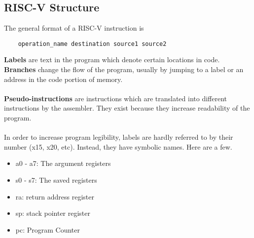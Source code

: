 \documentclass{article}
\begin{document}
\subsection{RISC-V Structure}
The general format of a RISC-V instruction is
\begin{lstlisting}
    operation_name destination source1 source2
\end{lstlisting}
\textbf{Labels} are text in the program which denote certain locations in code. \textbf{Branches} change the flow of the program,
usually by jumping to a label or an address in the code portion of memory.\\\\
\textbf{Pseudo-instructions} are instructions which are translated into different instructions by the assembler. They exist because they increase
readability of the program.\\\\
In order to increase program legibility, labels are hardly referred to by their number (x15, x20, etc). Instead, they have symbolic names. Here are a few.
\begin{itemize}
    \item a0 - a7: The argument registers
    \item s0 - s7: The saved registers
    \item ra: return address register
    \item sp: stack pointer register
    \item pc: Program Counter
\end{itemize}
\end{document}

